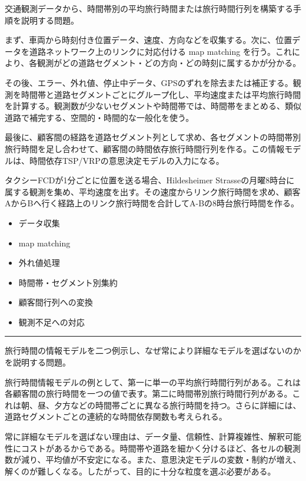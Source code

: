 \clearpage
{}
交通観測データから、時間帯別の平均旅行時間または旅行時間行列を構築する手順を説明する問題。\par
{}
まず、車両から時刻付き位置データ、速度、方向などを収集する。次に、位置データを道路ネットワーク上のリンクに対応付ける map matching を行う。これにより、各観測がどの道路セグメント・どの方向・どの時刻に属するかが分かる。\par
その後、エラー、外れ値、停止中データ、GPSのずれを除去または補正する。観測を時間帯と道路セグメントごとにグループ化し、平均速度または平均旅行時間を計算する。観測数が少ないセグメントや時間帯では、時間帯をまとめる、類似道路で補完する、空間的・時間的な一般化を使う。\par
最後に、顧客間の経路を道路セグメント列として求め、各セグメントの時間帯別旅行時間を足し合わせて、顧客間の時間依存旅行時間行列を作る。この情報モデルは、時間依存TSP/VRPの意思決定モデルの入力になる。\par
{}
タクシーFCDが1分ごとに位置を送る場合、Hildesheimer Strasseの月曜8時台に属する観測を集め、平均速度を出す。その速度からリンク旅行時間を求め、顧客AからBへ行く経路上のリンク旅行時間を合計してA-Bの8時台旅行時間を作る。\par
{}
\begin{itemize}
\item データ収集
\item map matching
\item 外れ値処理
\item 時間帯・セグメント別集約
\item 顧客間行列への変換
\item 観測不足への対応
\end{itemize}
\vspace{2mm}\hrule\vspace{2mm}
旅行時間の情報モデルを二つ例示し、なぜ常により詳細なモデルを選ばないのかを説明する問題。\par
{}
旅行時間情報モデルの例として、第一に単一の平均旅行時間行列がある。これは各顧客間の旅行時間を一つの値で表す。第二に時間帯別旅行時間行列がある。これは朝、昼、夕方などの時間帯ごとに異なる旅行時間を持つ。さらに詳細には、道路セグメントごとの連続的な時間依存関数も考えられる。\par
常に詳細なモデルを選ばない理由は、データ量、信頼性、計算複雑性、解釈可能性にコストがあるからである。時間帯や道路を細かく分けるほど、各セルの観測数が減り、平均値が不安定になる。また、意思決定モデルの変数・制約が増え、解くのが難しくなる。したがって、目的に十分な粒度を選ぶ必要がある。\par
